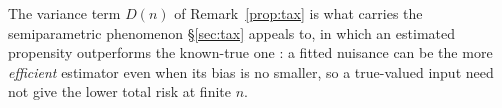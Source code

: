 \noindent The variance term $D(n)$ of Remark~\ref{prop:tax} is what carries the semiparametric
phenomenon \S\ref{sec:tax} appeals to, in which an estimated propensity outperforms the
known-true one \cite{hirano2003,robins1997,chernozhukov2018dml}: a fitted nuisance can be the more \emph{efficient}
estimator even when its bias is no smaller, so a true-valued input need not give the lower total
risk at finite $n$.


